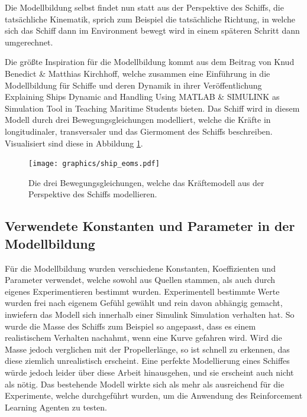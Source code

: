 \documentclass[]{iat}
\begin{document}
Die Modellbildung selbst findet nun statt aus der Perspektive des Schiffs, die tatsächliche Kinematik, sprich zum Beispiel die tatsächliche Richtung, in welche sich das Schiff dann im Environment bewegt wird in einem späteren Schritt dann umgerechnet.

Die größte Inspiration für die Modellbildung kommt aus dem Beitrag von Knud Benedict \& Matthias Kirchhoff, welche zusammen eine Einführung in die Modellbildung für Schiffe und deren Dynamik in ihrer Veröffentlichung \glqq Explaining Ships Dynamic and Handling Using MATLAB \& SIMULINK as Simulation Tool in Teaching Maritime Students\grqq{} \cite[]{Benedict2007ExplainingSD} bieten. Das Schiff wird in diesem Modell durch drei Bewegungsgleichungen modelliert, welche die Kräfte in longitudinaler, transversaler und das Giermoment des Schiffs beschreiben. Visualisiert sind diese in Abbildung \ref{abb:ship_eoms}.
\begin{figure}[H]
    \texttt{[image: graphics/ship\_eoms.pdf]}
    \centering
    \caption{Die drei Bewegungsgleichungen, welche das Kräftemodell aus der Perspektive des Schiffs modellieren.}
    \label{abb:ship_eoms}
\end{figure}

\subsection{Verwendete Konstanten und Parameter in der Modellbildung}
Für die Modellbildung wurden verschiedene Konstanten, Koeffizienten und Parameter verwendet, welche sowohl aus Quellen stammen, als auch durch eigenes Experimentieren bestimmt wurden. Experimentell bestimmte Werte wurden frei nach eigenem Gefühl gewählt und rein davon abhängig gemacht, inwiefern das Modell sich innerhalb einer Simulink Simulation verhalten hat. So wurde die Masse des Schiffs zum Beispiel so angepasst, dass es einem \glqq realistischem\grqq{} Verhalten nachahmt, wenn eine Kurve gefahren wird. Wird die Masse jedoch verglichen mit der Propellerlänge, so ist schnell zu erkennen, das diese ziemlich unrealistisch erscheint. Eine perfekte Modellierung eines Schiffes würde jedoch leider über diese Arbeit hinausgehen, und sie erscheint auch nicht als nötig. Das bestehende Modell wirkte sich als mehr als ausreichend für die Experimente, welche durchgeführt wurden, um die Anwendung des Reinforcement Learning Agenten zu testen.
\end{document}
